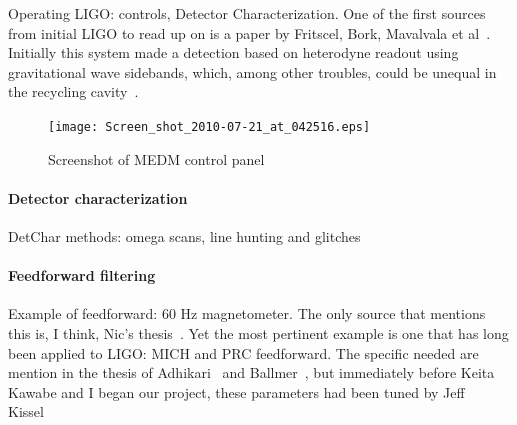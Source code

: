                 Operating LIGO: controls, Detector Characterization. One of the first sources from initial LIGO to read up on is a paper by Fritscel, Bork, Mavalvala et al~\cite{ReadoutGWA}. Initially this system made a detection based on heterodyne readout using gravitational wave sidebands, which, among other troubles, could be unequal in the recycling cavity~\cite{MeadorsHanford2005}.

	\begin{figure}
	\begin{center}
	\texttt{[image: Screen\_shot\_2010-07-21\_at\_042516.eps]}
	\caption{Screenshot of MEDM control panel}
	\label{ScreenshotMEDM}
	\end{center}
	\end{figure}


                \paragraph{Detector characterization}
                \label{detchar}
            
                    DetChar methods: omega scans, line hunting and glitches

                \paragraph{Feedforward filtering}
                \label{feedforward_filters}

                    Example of feedforward: 60 Hz magnetometer. The only source that mentions this is, I think, Nic's thesis~\cite{SmithThesis}. Yet the most pertinent example is one that has long been applied to LIGO: MICH and PRC feedforward. The specific needed are mention in the thesis of Adhikari~\cite{AdhikariThesis} and Ballmer~\cite{BallmerThesis}, but immediately before Keita Kawabe and I began our project, these parameters had been tuned by Jeff Kissel~\cite{KissellPRCMICH}


